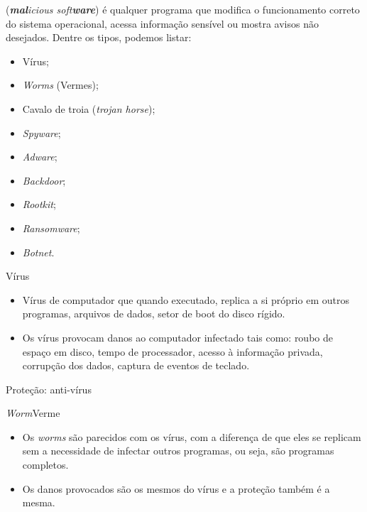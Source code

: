 \lecturetitle{\insertlecture}{\course}

\frame{\maketitle}

\begin{frame}{\insertlecture}\small
  
  {\it \insertlecture} ({\it {\bf mal}icious soft{\bf ware}\/}) é qualquer programa que modifica 
  o funcionamento correto do sistema operacional, acessa informação sensível ou 
  mostra avisos não desejados. \pause Dentre os tipos, podemos listar:

  \begin{itemize}
  \item Vírus;
  \item {\it Worms\/} (Vermes);
  \item Cavalo de troia ({\it trojan horse\/});
  \item {\it Spyware\/};
  \item {\it Adware\/};
  \item {\it Backdoor\/};
  \item {\it Rootkit\/};
  \item {\it Ransomware\/};
  \item {\it Botnet\/}.
  \end{itemize}
\end{frame}

\begin{frame}{Vírus}
\begin{itemize}[<+->]
\item Vírus de computador que quando executado, replica a si próprio
  em outros programas, arquivos de dados, setor de boot do disco
  rígido.
\item Os vírus provocam danos ao computador infectado tais como: roubo
  de espaço em disco, tempo de processador, acesso à informação
  privada, corrupção dos dados, captura de eventos de teclado.
\end{itemize}

\pause\bigskip
\alert{Proteção: anti-vírus}
\end{frame}

\begin{frame}{\em Worm}{Verme}

  \begin{itemize}[<+->]
    \item Os {\em worms} são parecidos com os vírus, com a diferença de que eles 
      se replicam sem a necessidade de infectar outros programas, ou seja, 
      são programas completos.
    \item Os danos provocados são os mesmos do vírus e a proteção também é a 
      mesma.
    \end{itemize}
\end{frame}

